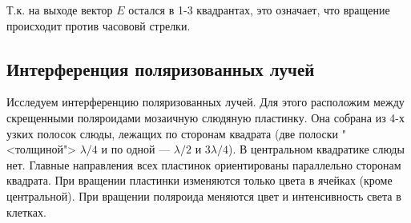 \documentclass[a4paper, 12pt]{article}
\begin{document}
Т.к. на выходе вектор $E$ остался в 1-3 квадрантах, это означает, что вращение происходит против часововй стрелки.

\subsection{Интерференция поляризованных лучей}

Исследуем интерференцию поляризованных лучей. Для этого расположим между скрещенными поляроидами мозаичную слюдяную пластинку. Она собрана из 4-х узких полосок слюды, лежащих по сторонам квадрата (две полоски "<толщиной"> $ \lambda/4 $ и по одной --- $ \lambda/2 $ и $ 3\lambda/4 $). В центральном квадратике слюды нет. Главные направления всех пластинок ориентированы параллельно сторонам квадрата.
При вращении пластинки изменяются только цвета в ячейках (кроме центральной). При вращении поляроида меняются цвет и интенсивность света в клетках.
\end{document}
